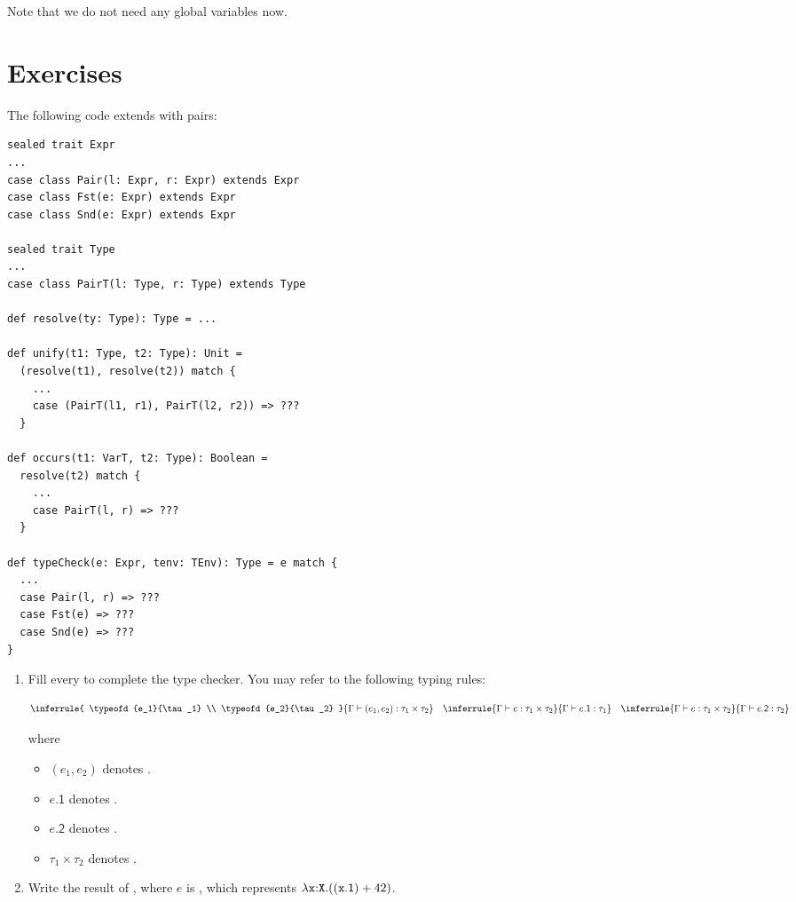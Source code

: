 Note that we do not need any global variables now.

\section{Exercises}

\begin{exercise}

The following code extends \lang with pairs:

\begin{verbatim}
sealed trait Expr
...
case class Pair(l: Expr, r: Expr) extends Expr
case class Fst(e: Expr) extends Expr
case class Snd(e: Expr) extends Expr

sealed trait Type
...
case class PairT(l: Type, r: Type) extends Type

def resolve(ty: Type): Type = ...

def unify(t1: Type, t2: Type): Unit =
  (resolve(t1), resolve(t2)) match {
    ...
    case (PairT(l1, r1), PairT(l2, r2)) => ???
  }

def occurs(t1: VarT, t2: Type): Boolean =
  resolve(t2) match {
    ...
    case PairT(l, r) => ???
  }

def typeCheck(e: Expr, tenv: TEnv): Type = e match {
  ...
  case Pair(l, r) => ???
  case Fst(e) => ???
  case Snd(e) => ???
}
\end{verbatim}

    \begin{enumerate}
        \item
Fill every  to complete the type checker.
You may refer to the following typing rules:

\[
\inferrule
{ \typeofd{e_1}{\tau_1} \\ \typeofd{e_2}{\tau_2} }
{ \typeofd{(e_1,e_2)}{\tau_1\times\tau_2} }
\quad
\inferrule
{ \typeofd{e}{\tau_1\times\tau_2} }
{ \typeofd{e\textsf{.1}}{\tau_1} }
\quad
\inferrule
{ \typeofd{e}{\tau_1\times\tau_2} }
{ \typeofd{e\textsf{.2}}{\tau_2} }
\]

where

        \begin{itemize}
        \item $(e_1,e_2)$ denotes .
        \item $e\textsf{.1}$ denotes .
        \item $e\textsf{.2}$ denotes .
        \item $\tau_1\times\tau_2$ denotes .
        \end{itemize}
  \item
    Write the result of , where $e$ is
    ,
    which represents
    $\lambda\texttt{x}{:}\texttt{X}.((\texttt{x}\textsf{.1})+42)$.
\end{enumerate}

\end{exercise}

